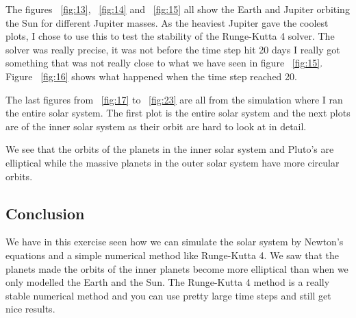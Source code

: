 \documentclass[a4wide,12pt]{article}
\begin{document}
The figures ~\ref{fig:13}, ~\ref{fig:14} and ~\ref{fig:15} all show the Earth and Jupiter orbiting the Sun for different Jupiter masses. 
As the heaviest Jupiter gave the coolest plots, I chose to use this to test the stability of the Runge-Kutta 4 solver. The solver was really precise,
it was not before the time step hit 20 days I really got something that was not really close to what we have seen in figure ~\ref{fig:15}. Figure ~\ref{fig:16} shows what happened when the time step reached 20.

The last figures from ~\ref{fig:17} to ~\ref{fig:23} are all from the simulation where I ran the entire solar system. The first plot is the entire solar system
and the next plots are of the inner solar system as their orbit are hard to look at in detail. 

We see that the orbits of the planets in the inner solar system and Pluto's are elliptical while the massive planets in the outer solar system have more circular orbits. 
\subsection*{Conclusion}
We have in this exercise seen how we can simulate the solar system by Newton's equations and a simple numerical method like Runge-Kutta 4. 
We saw that the planets made the orbits of the inner planets become more elliptical than when we only modelled the Earth and the Sun. 
The Runge-Kutta 4 method is a really stable numerical method and you can use pretty large time steps and still get nice results. 
\end{document}
